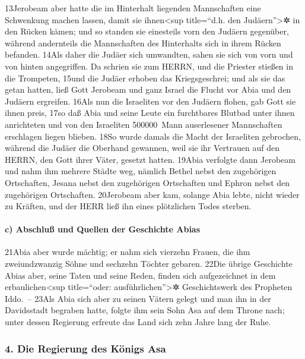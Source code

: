 13Jerobeam aber hatte die im Hinterhalt liegenden Mannschaften eine
Schwenkung machen lassen, damit sie ihnen\textless sup title=``d.h. den
Judäern''\textgreater✲ in den Rücken kämen; und so standen sie
einesteils vorn den Judäern gegenüber, während andernteils die
Mannschaften des Hinterhalts sich in ihrem Rücken befanden. 14Als daher
die Judäer sich umwandten, sahen sie sich von vorn und von hinten
angegriffen. Da schrien sie zum HERRN, und die Priester stießen in die
Trompeten, 15und die Judäer erhoben das Kriegsgeschrei; und als sie das
getan hatten, ließ Gott Jerobeam und ganz Israel die Flucht vor Abia und
den Judäern ergreifen. 16Als nun die Israeliten vor den Judäern flohen,
gab Gott sie ihnen preis, 17so daß Abia und seine Leute ein furchtbares
Blutbad unter ihnen anrichteten und von den Israeliten 500000~Mann
auserlesener Mannschaften erschlagen liegen blieben. 18So wurde damals
die Macht der Israeliten gebrochen, während die Judäer die Oberhand
gewannen, weil sie ihr Vertrauen auf den HERRN, den Gott ihrer Väter,
gesetzt hatten. 19Abia verfolgte dann Jerobeam und nahm ihm mehrere
Städte weg, nämlich Bethel nebst den zugehörigen Ortschaften, Jesana
nebst den zugehörigen Ortschaften und Ephron nebst den zugehörigen
Ortschaften. 20Jerobeam aber kam, solange Abia lebte, nicht wieder zu
Kräften, und der HERR ließ ihn eines plötzlichen Todes sterben.

\hypertarget{c-abschluuxdf-und-quellen-der-geschichte-abias}{%
\paragraph{c) Abschluß und Quellen der Geschichte
Abias}\label{c-abschluuxdf-und-quellen-der-geschichte-abias}}

21Abia aber wurde mächtig; er nahm sich vierzehn Frauen, die ihm
zweiundzwanzig Söhne und sechzehn Töchter gebaren. 22Die übrige
Geschichte Abias aber, seine Taten und seine Reden, finden sich
aufgezeichnet in dem erbaulichen\textless sup title=``oder:
ausführlichen''\textgreater✲ Geschichtswerk des Propheten Iddo.~-- 23Als
Abia sich aber zu seinen Vätern gelegt und man ihn in der Davidsstadt
begraben hatte, folgte ihm sein Sohn Asa auf dem Throne nach; unter
dessen Regierung erfreute das Land sich zehn Jahre lang der Ruhe.

\hypertarget{die-regierung-des-kuxf6nigs-asa}{%
\subsubsection{4. Die Regierung des Königs
Asa}\label{die-regierung-des-kuxf6nigs-asa}}


